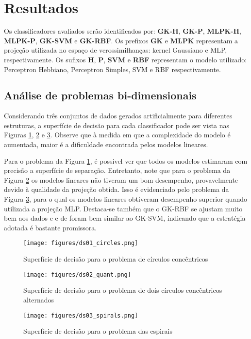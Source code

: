 \documentclass[conference]{IEEEtran}
\begin{document}
	\section{Resultados}
	Os classificadores avaliados serão identificados por: \textbf{GK-H}, \textbf{GK-P}, \textbf{MLPK-H}, \textbf{MLPK-P}, \textbf{GK-SVM} e \textbf{GK-RBF}. Os prefixos \textbf{GK} e \textbf{MLPK} representam a projeção utilizada no espaço de verossimilhanças: kernel Gaussiano e MLP, respectivamente. Os sufixos \textbf{H}, \textbf{P}, \textbf{SVM} e \textbf{RBF} representam o modelo utilizado: Perceptron Hebbiano, Perceptron Simples, SVM e RBF respectivamente.
	
	\subsection{Análise de problemas bi-dimensionais}
	Considerando três conjuntos de dados gerados artificialmente para diferentes estruturas, a superfície de decisão para cada classificador pode ser vista nas Figuras \ref{fig:ds01_circles}, \ref{fig:ds02_quant} e \ref{fig:ds03_spirals}. Observe que à medida em que a complexidade do modelo é aumentada, maior é a dificuldade encontrada pelos modelos lineares. 
	
	Para o problema da Figura \ref{fig:ds01_circles}, é possível ver que todos os modelos estimaram com precisão a superfície de separação. Entretanto, note que para o problema da Figura \ref{fig:ds02_quant} os modelos lineares não tiveram um bom desempenho, provavelmente devido à qualidade da projeção obtida. Isso é evidenciado pelo problema da Figura \ref{fig:ds03_spirals}, para o qual os modelos lineares obtiveram desempenho superior quando utilizada a projeção MLP. Destaca-se também que o GK-RBF se ajustam muito bem aos dados e e de foram bem similar ao GK-SVM, indicando que a estratégia adotada é bastante promissora.
	
	
	\begin{figure}[thpbh]
		\centering
		\texttt{[image: figures/ds01\_circles.png]}
		\caption{Superfície de decisão para o problema de círculos concêntricos}
		\label{fig:ds01_circles}
	\end{figure}
	\begin{figure}[thpbh]
		\centering
		\texttt{[image: figures/ds02\_quant.png]}
		\caption{Superfície de decisão para o problema de dois círculos concêntricos alternados}
		\label{fig:ds02_quant}
	\end{figure}
	\begin{figure}[thpbh]
		\centering
		\texttt{[image: figures/ds03\_spirals.png]}
		\caption{Superfície de decisão para o problema das espirais}
		\label{fig:ds03_spirals}
	\end{figure}
\end{document}
